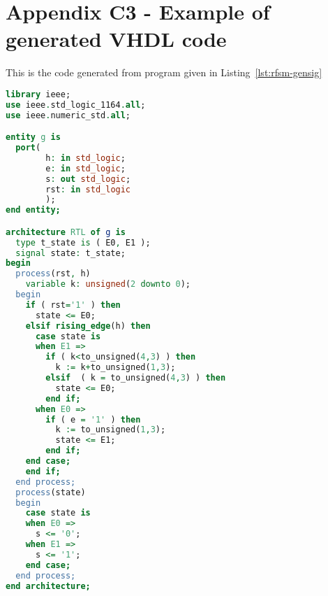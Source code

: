 \chapter*{Appendix C3 - Example of generated VHDL code}  
\label{cha:ex1-vhdl}

This is the code generated from program given in Listing~\ref{lst:rfsm-gensig} 

\begin{lstlisting}[language=VHDL,frame=single,numbers=none,basicstyle=\small,caption=File g.vhd]
library ieee;
use ieee.std_logic_1164.all;
use ieee.numeric_std.all;

entity g is
  port(
        h: in std_logic;
        e: in std_logic;
        s: out std_logic;
        rst: in std_logic
        );
end entity;

architecture RTL of g is
  type t_state is ( E0, E1 );
  signal state: t_state;
begin
  process(rst, h)
    variable k: unsigned(2 downto 0);
  begin
    if ( rst='1' ) then
      state <= E0;
    elsif rising_edge(h) then 
      case state is
      when E1 =>
        if ( k<to_unsigned(4,3) ) then
          k := k+to_unsigned(1,3);
        elsif  ( k = to_unsigned(4,3) ) then
          state <= E0;
        end if;
      when E0 =>
        if ( e = '1' ) then
          k := to_unsigned(1,3);
          state <= E1;
        end if;
    end case;
    end if;
  end process;
  process(state)
  begin
    case state is
    when E0 =>
      s <= '0';
    when E1 =>
      s <= '1';
    end case;
  end process;
end architecture;
\end{lstlisting}

